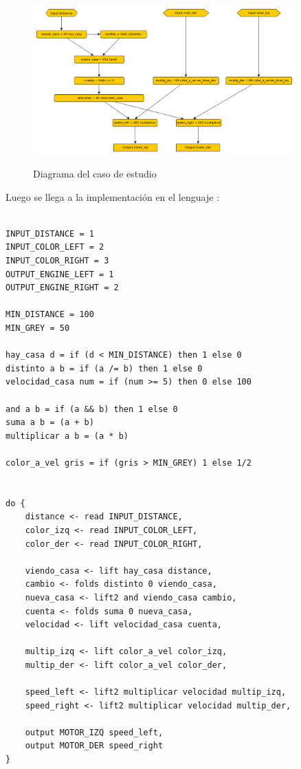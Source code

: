 \begin{figure}[hbtp]
\begin{center}
\caption{Diagrama del caso de estudio}
\includegraphics[width=0.9\textwidth]{graphs/delivery.png}
\label{fig:delivery}
\end{center}
\end{figure}

Luego se llega a la implementación en el lenguaje \frob{}:

\begin{verbatim}

INPUT_DISTANCE = 1
INPUT_COLOR_LEFT = 2
INPUT_COLOR_RIGHT = 3
OUTPUT_ENGINE_LEFT = 1
OUTPUT_ENGINE_RIGHT = 2

MIN_DISTANCE = 100
MIN_GREY = 50

hay_casa d = if (d < MIN_DISTANCE) then 1 else 0
distinto a b = if (a /= b) then 1 else 0
velocidad_casa num = if (num >= 5) then 0 else 100

and a b = if (a && b) then 1 else 0
suma a b = (a + b)
multiplicar a b = (a * b)

color_a_vel gris = if (gris > MIN_GREY) 1 else 1/2


do {
    distance <- read INPUT_DISTANCE,
    color_izq <- read INPUT_COLOR_LEFT,
    color_der <- read INPUT_COLOR_RIGHT,

    viendo_casa <- lift hay_casa distance,
    cambio <- folds distinto 0 viendo_casa,
    nueva_casa <- lift2 and viendo_casa cambio,
    cuenta <- folds suma 0 nueva_casa,
    velocidad <- lift velocidad_casa cuenta,

    multip_izq <- lift color_a_vel color_izq,
    multip_der <- lift color_a_vel color_der,

    speed_left <- lift2 multiplicar velocidad multip_izq,
    speed_right <- lift2 multiplicar velocidad multip_der,

    output MOTOR_IZQ speed_left,
    output MOTOR_DER speed_right
}

\end{verbatim}

